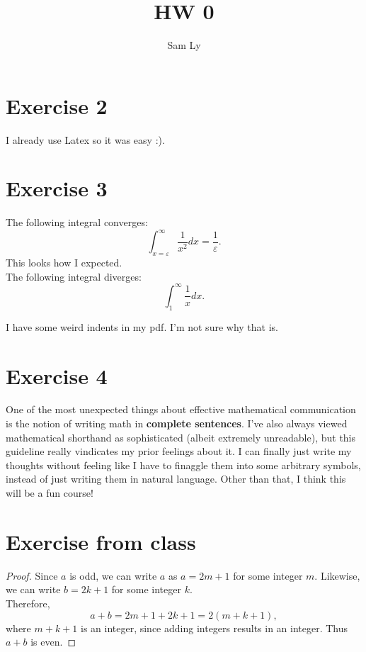 \documentclass{article}
\title{HW 0}
\author{Sam Ly}
\begin{document}
\maketitle

\section*{Exercise 2}
I already use Latex so it was easy :).

\section*{Exercise 3}
The following integral converges: 
\[
    \int_{x=\varepsilon}^\infty \frac{1}{x^2} dx = \frac{1}{\varepsilon}.
\]
This looks how I expected.
\\The following integral diverges: 
\[
    \int_1^\infty \frac 1 x dx .
\]

I have some weird indents in my pdf. I'm not sure why that is.

\section*{Exercise 4}

One of the most unexpected things about effective mathematical communication is 
the notion of writing math in \textbf{complete sentences}. I've also always viewed
mathematical shorthand as sophisticated (albeit extremely unreadable), but this 
guideline really vindicates my prior feelings about it. I can finally just write
my thoughts without feeling like I have to finaggle them into some arbitrary
symbols, instead of just writing them in natural language. Other than that, I
think this will be a fun course!


\section*{Exercise from class}

\begin{proof}
    Since \(a\) is odd, we can write $a$ as \(a = 2m + 1\) for some integer \(m\).
    Likewise, we can write \(b = 2k + 1\) for some integer \(k\). 
    \\ Therefore,
    \[
        a + b = 2m + 1 + 2k + 1 = 2(m + k + 1),
    \]
    where \(m + k + 1\) is an integer, since adding integers results in an integer.
    Thus \(a + b\) is even.

\end{proof}
\end{document}
